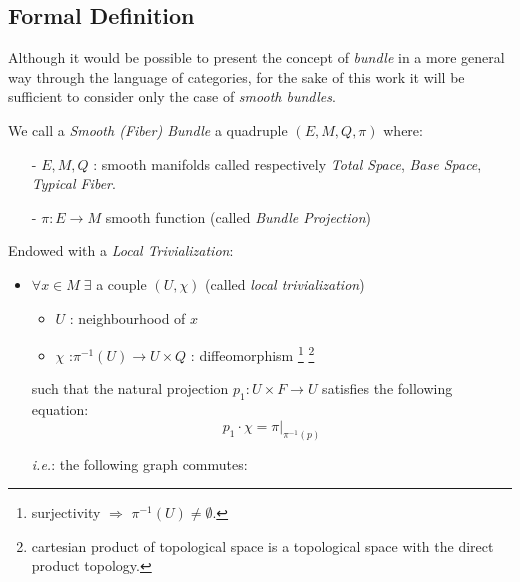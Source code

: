 \documentclass[Main]{subfiles}
\begin{document}
		\subsection{Formal Definition}
			Although it would be possible to present the concept of \emph{bundle} in a more general way through the language of categories, for the sake of this work it will be sufficient to consider only the case of \emph{smooth bundles}.
			\begin{definition}\label{Def:SmoothBundle}
				We call a \emph{Smooth (Fiber) Bundle}  a quadruple $(E,M,Q,\pi)$ where:
				\begin{itemize}
					\item[-] $E,M,Q$ :  smooth manifolds called respectively \emph{Total Space}, \emph{Base Space}, \emph{Typical Fiber}.
					\item[-] $\pi : E \rightarrow M $ smooth function (called \emph{Bundle Projection})
				\end{itemize}
				Endowed with a \emph{Local Trivialization}:
				\begin{itemize}
					\item $\forall x \in M \; \exists$ a couple $(U, \chi)$ (called \emph{local trivialization})
					\begin{itemize}
						\item $U$ : neighbourhood of $x$
						\item $\chi$ :$\pi^{-1}(U) \rightarrow U \times Q$ : diffeomorphism
 							\footnote{surjectivity $\Rightarrow$ $\pi^{-1}(U) \neq \emptyset$.} 
 							\footnote{cartesian product of topological space is a topological space with the direct product topology.}
					\end{itemize}
					such that the natural projection $p_1 : U \times F \rightarrow U$ satisfies the following equation: $$p_1 \cdot \chi = \pi \vert_{\pi^{-1}(p)}$$

					\textit{i.e.}: the following graph commutes:
					
					\begin{center}
					\end{center}


				\end{itemize}
			\end{definition}
\end{document}
